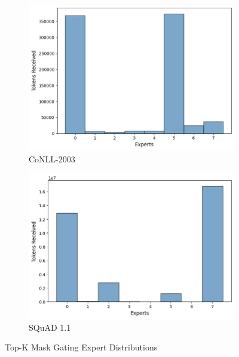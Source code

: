 \documentclass[12pt]{article}
\begin{document}
\begin{figure}[h]
\centering
\begin{subfigure}{.5\textwidth}
  \centering
  \includegraphics[width=1\linewidth]{report_images/conll/top_k_mask.png}
  \caption{CoNLL-2003}
  \label{fig:mask_conll}
\end{subfigure}%
\begin{subfigure}{.5\textwidth}
  \centering
  \includegraphics[width=1\linewidth]{report_images/squad/top_k_mask.png}
  \caption{SQuAD 1.1}
  \label{fig:mask_squad}
\end{subfigure}
\caption{Top-K Mask Gating Expert Distributions}
\label{fig:mask}
\end{figure}
\FloatBarrier
\end{document}
